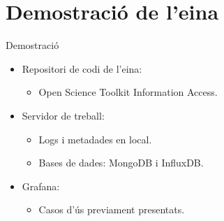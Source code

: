 \section{Demostració de l'eina}\label{sec:demo}

\begin{frame}{Demostració}

\begin{itemize}
    \item Repositori de codi de l'eina:
    \begin{itemize}
        \item Open Science Toolkit Information Access.
    \end{itemize}
    \item Servidor de treball:
    \begin{itemize}
        \item Logs i metadades en local.
        \item Bases de dades: MongoDB i InfluxDB.
    \end{itemize}
    \item Grafana:
    \begin{itemize}
        \item Casos d'ús previament presentats.
    \end{itemize}
\end{itemize}

\end{frame}

